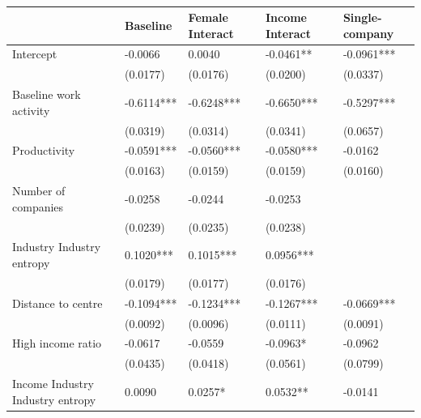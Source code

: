 \begin{table}
\caption{}
\label{}
\begin{center}
\begin{tabular}{lllll}
\hline
                                         & Baseline   & Female Interact & Income Interact & Single-company  \\
\hline
Intercept                                & -0.0066    & 0.0040          & -0.0461**       & -0.0961***      \\
                                         & (0.0177)   & (0.0176)        & (0.0200)        & (0.0337)        \\
Baseline work activity             & -0.6114*** & -0.6248***      & -0.6650***      & -0.5297***      \\
                                         & (0.0319)   & (0.0314)        & (0.0341)        & (0.0657)        \\
Productivity                             & -0.0591*** & -0.0560***      & -0.0580***      & -0.0162         \\
                                         & (0.0163)   & (0.0159)        & (0.0159)        & (0.0160)        \\
Number of companies                             & -0.0258    & -0.0244         & -0.0253         &                 \\
                                         & (0.0239)   & (0.0235)        & (0.0238)        &                 \\
Industry Industry entropy                                  & 0.1020***  & 0.1015***       & 0.0956***       &                 \\
                                         & (0.0179)   & (0.0177)        & (0.0176)        &                 \\
Distance to centre                       & -0.1094*** & -0.1234***      & -0.1267***      & -0.0669***      \\
                                         & (0.0092)   & (0.0096)        & (0.0111)        & (0.0091)        \\
High income ratio                  & -0.0617    & -0.0559         & -0.0963*        & -0.0962         \\
                                         & (0.0435)   & (0.0418)        & (0.0561)        & (0.0799)        \\
Income Industry Industry entropy                       & 0.0090     & 0.0257*         & 0.0532**        & -0.0141         \\

\end{tabular}
\end{center}
\end{table}
